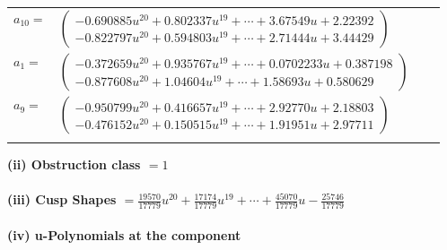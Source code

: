 \documentclass[1p]{elsarticle_modified}
\theoremstyle{definition}
\begin{document}
\begin{tabular}{m{7pt} m{180pt} m{7pt} m{180pt} }
\flushright $a_{10}=$&$\begin{pmatrix}-0.690885 u^{20}+0.802337 u^{19}+\cdots+3.67549 u+2.22392\\-0.822797 u^{20}+0.594803 u^{19}+\cdots+2.71444 u+3.44429\end{pmatrix}$ \\
\flushright $a_{1}=$&$\begin{pmatrix}-0.372659 u^{20}+0.935767 u^{19}+\cdots+0.0702233 u+0.387198\\-0.877608 u^{20}+1.04604 u^{19}+\cdots+1.58693 u+0.580629\end{pmatrix}$ \\
\flushright $a_{9}=$&$\begin{pmatrix}-0.950799 u^{20}+0.416657 u^{19}+\cdots+2.92770 u+2.18803\\-0.476152 u^{20}+0.150515 u^{19}+\cdots+1.91951 u+2.97711\end{pmatrix}$\\&\end{tabular}
\flushleft \textbf{(ii) Obstruction class $= 1$}\\~\\
\flushleft \textbf{(iii) Cusp Shapes $= \frac{19570}{17779} u^{20}+\frac{17174}{17779} u^{19}+\cdots+\frac{45070}{17779} u-\frac{25746}{17779}$}\\~\\
\newpage\renewcommand{\arraystretch}{1}
\flushleft \textbf{(iv) u-Polynomials at the component}\newline \\
\end{document}
